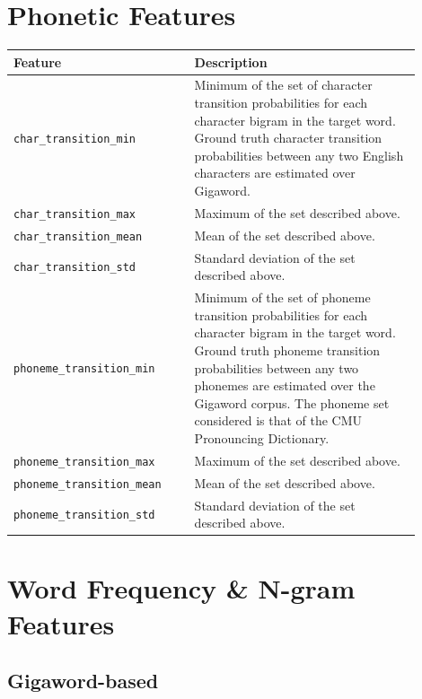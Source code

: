 \documentclass{dcthesis}
\theoremstyle{definition}
\theoremstyle{remark}
\begin{document}
\section{Phonetic Features}

\begin{table}[H]
  \centering
  \begin{tabular}{>{\centering\arraybackslash}p{0.4\linewidth}>{\arraybackslash}p{0.5\linewidth}}
    \textbf{Feature} & \textbf{Description} \\ \hline
    \texttt{char\_transition\_min} & Minimum of the set of character transition probabilities for each character bigram in the target word. Ground truth character transition probabilities between any two English characters are estimated over Gigaword.\\
    \hline 
    \texttt{char\_transition\_max} & Maximum of the set described above.\\
    \hline 
    \texttt{char\_transition\_mean} & Mean of the set described above.\\
    \hline 
    \texttt{char\_transition\_std} & Standard deviation of the set described above.\\
    \hline 
    \texttt{phoneme\_transition\_min} & Minimum of the set of phoneme transition probabilities for each character bigram in the target word. Ground truth phoneme transition probabilities between any two phonemes are estimated over the Gigaword corpus. The phoneme set considered is that of the CMU Pronouncing Dictionary.\tablefootnote{\url{http://www.speech.cs.cmu.edu/cgi-bin/cmudict}}\\
    \hline 
    \texttt{phoneme\_transition\_max} & Maximum of the set described above.\\
    \hline 
    \texttt{phoneme\_transition\_mean} & Mean of the set described above.\\
    \hline 
    \texttt{phoneme\_transition\_std} & Standard deviation of the set described above.\\
  \end{tabular}
  \label{phonetic_features}
\end{table}

\section{Word Frequency \& N-gram Features}

\subsection{Gigaword-based}
\end{document}

